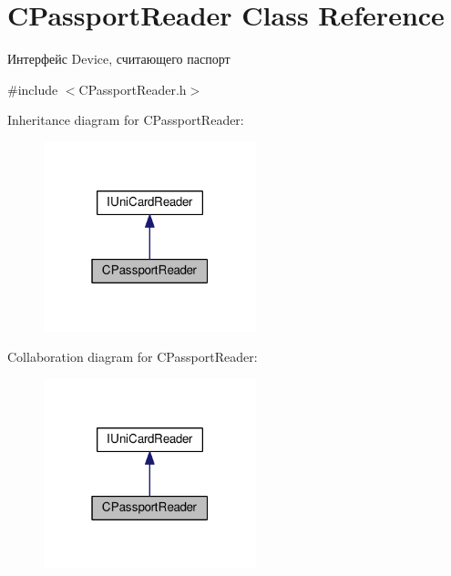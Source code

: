 \hypertarget{classCPassportReader}{}\section{C\+Passport\+Reader Class Reference}
\label{classCPassportReader}


Интерфейс Device, считающего паспорт  




{\ttfamily \#include $<$C\+Passport\+Reader.\+h$>$}



Inheritance diagram for C\+Passport\+Reader\+:\nopagebreak
\begin{figure}[H]
\begin{center}
\leavevmode
\includegraphics[width=175pt]{classCPassportReader__inherit__graph}
\end{center}
\end{figure}


Collaboration diagram for C\+Passport\+Reader\+:\nopagebreak
\begin{figure}[H]
\begin{center}
\leavevmode
\includegraphics[width=175pt]{classCPassportReader__coll__graph}
\end{center}
\end{figure}
